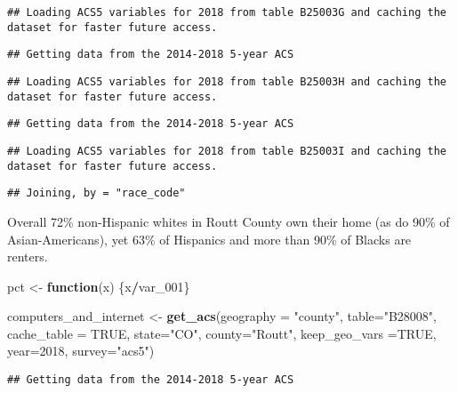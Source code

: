 \documentclass[]{article}
\newenvironment{Shaded}{\begin{snugshade}}{\end{snugshade}}
\newcommand{\ControlFlowTok}[1]{\textcolor[rgb]{0.13,0.29,0.53}{\textbf{#1}}}
\newcommand{\DataTypeTok}[1]{\textcolor[rgb]{0.13,0.29,0.53}{#1}}
\newcommand{\DecValTok}[1]{\textcolor[rgb]{0.00,0.00,0.81}{#1}}
\newcommand{\KeywordTok}[1]{\textcolor[rgb]{0.13,0.29,0.53}{\textbf{#1}}}
\newcommand{\NormalTok}[1]{#1}
\newcommand{\OperatorTok}[1]{\textcolor[rgb]{0.81,0.36,0.00}{\textbf{#1}}}
\newcommand{\OtherTok}[1]{\textcolor[rgb]{0.56,0.35,0.01}{#1}}
\newcommand{\StringTok}[1]{\textcolor[rgb]{0.31,0.60,0.02}{#1}}
\begin{document}
\begin{verbatim}
## Loading ACS5 variables for 2018 from table B25003G and caching the dataset for faster future access.
\end{verbatim}

\begin{verbatim}
## Getting data from the 2014-2018 5-year ACS
\end{verbatim}

\begin{verbatim}
## Loading ACS5 variables for 2018 from table B25003H and caching the dataset for faster future access.
\end{verbatim}

\begin{verbatim}
## Getting data from the 2014-2018 5-year ACS
\end{verbatim}

\begin{verbatim}
## Loading ACS5 variables for 2018 from table B25003I and caching the dataset for faster future access.
\end{verbatim}

\begin{verbatim}
## Joining, by = "race_code"
\end{verbatim}

Overall 72\% non-Hispanic whites in Routt County own their home (as do
90\% of Asian-Americans), yet 63\% of Hispanics and more than 90\% of
Blacks are renters.

\begin{Shaded}
\begin{Highlighting}[]
\NormalTok{pct <-}\StringTok{ }\ControlFlowTok{function}\NormalTok{(x) \{x}\OperatorTok{/}\NormalTok{var_}\DecValTok{001}\NormalTok{\}}

\NormalTok{computers_and_internet <-}\StringTok{ }\KeywordTok{get_acs}\NormalTok{(}\DataTypeTok{geography =} \StringTok{"county"}\NormalTok{, }\DataTypeTok{table=}\StringTok{"B28008"}\NormalTok{, }\DataTypeTok{cache_table =} \OtherTok{TRUE}\NormalTok{, }\DataTypeTok{state=}\StringTok{"CO"}\NormalTok{, }\DataTypeTok{county=}\StringTok{"Routt"}\NormalTok{, }\DataTypeTok{keep_geo_vars =}\OtherTok{TRUE}\NormalTok{, }\DataTypeTok{year=}\DecValTok{2018}\NormalTok{, }\DataTypeTok{survey=}\StringTok{"acs5"}\NormalTok{)}
\end{Highlighting}
\end{Shaded}

\begin{verbatim}
## Getting data from the 2014-2018 5-year ACS
\end{verbatim}
\end{document}
